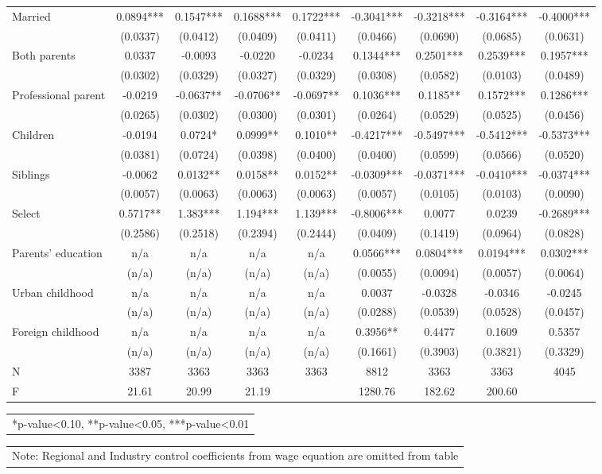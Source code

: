 \documentclass[12pt]{report}
\begin{document}
\begin{sidewaystable}
\begin{tabular}{lc|c|c|c|c|c|c|c}
Married & 0.0894*** & 0.1547*** & 0.1688*** & 0.1722*** & -0.3041*** & -0.3218*** & -0.3164*** & -0.4000***\\
& (0.0337) & (0.0412) & (0.0409) & (0.0411) & (0.0466) & (0.0690) & (0.0685) & (0.0631)\\
Both parents & 0.0337 & -0.0093 & -0.0220 & -0.0234 & 0.1344*** & 0.2501*** & 0.2539*** & 0.1957***\\
& (0.0302) & (0.0329) & (0.0327) & (0.0329) & (0.0308) & (0.0582) & (0.0103) & (0.0489)\\
Professional parent & -0.0219 & -0.0637** & -0.0706** & -0.0697** & 0.1036*** & 0.1185** & 0.1572*** & 0.1286***\\
& (0.0265) & (0.0302) & (0.0300) & (0.0301) & (0.0264) & (0.0529) & (0.0525) & (0.0456)\\
Children & -0.0194 & 0.0724* & 0.0999** & 0.1010** & -0.4217*** & -0.5497*** & -0.5412*** & -0.5373***\\
& (0.0381) & (0.0724) & (0.0398) & (0.0400) & (0.0400) & (0.0599) & (0.0566) & (0.0520)\\
Siblings & -0.0062 & 0.0132** & 0.0158** & 0.0152** & -0.0309*** & -0.0371*** & -0.0410*** & -0.0374***\\
& (0.0057) & (0.0063) & (0.0063) & (0.0063) & (0.0057) & (0.0105) & (0.0103) & (0.0090)\\
Select & 0.5717** & 1.383*** & 1.194*** & 1.139*** & -0.8006*** & 0.0077 & 0.0239 & -0.2689***\\
& (0.2586) & (0.2518) & (0.2394) & (0.2444) & (0.0409) & (0.1419) & (0.0964) & (0.0828)\\
Parents' education & n/a & n/a & n/a & n/a & 0.0566*** & 0.0804*** & 0.0194*** & 0.0302***\\
& (n/a) & (n/a) & (n/a) & (n/a) & (0.0055) & (0.0094) & (0.0057) & (0.0064)\\
Urban childhood & n/a & n/a & n/a & n/a & 0.0037 & -0.0328 & -0.0346 & -0.0245\\
& (n/a) & (n/a) & (n/a) & (n/a) & (0.0288) & (0.0539) & (0.0528) & (0.0457)\\
Foreign childhood & n/a & n/a & n/a & n/a & 0.3956** & 0.4477 & 0.1609 & 0.5357\\
& (n/a) & (n/a) & (n/a) & (n/a) & (0.1661) & (0.3903) & (0.3821) & (0.3329)\\
\hline
N & 3387 & 3363 & 3363 & 3363 & 8812 & 3363 & 3363 & 4045\\
F & 21.61 & 20.99 & 21.19 & & 1280.76 & 182.62 & 200.60 & \\
\hline
\hline
\end{tabular}
\begin{tabular}{p{6.25in}}\footnotesize{
*p-value<0.10, **p-value<0.05, ***p-value<0.01}\\
\end{tabular}
\begin{tabular}{p{6.25in}}\footnotesize{
Note: Regional and Industry control coefficients from wage equation are omitted from table}\\
\end{tabular}
\end{sidewaystable}
\end{document}

